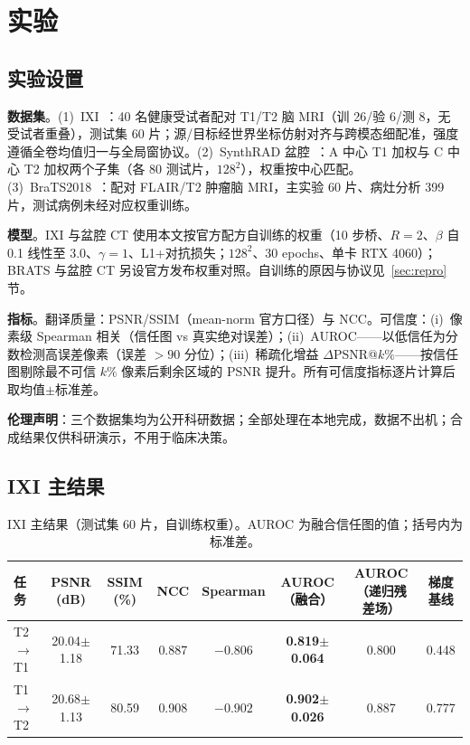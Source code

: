 \documentclass[11pt,a4paper]{ctexart}
\newcommand{\rcrf}{递归残差场}
\begin{document}
\section{实验}

\subsection{实验设置}

\textbf{数据集}。(1)~IXI~\cite{ixi_dataset}：40 名健康受试者配对 T1/T2 脑 MRI（训 26/验 6/测 8，无受试者重叠），测试集 60 片；源/目标经世界坐标仿射对齐与跨模态细配准，强度遵循全卷均值归一与全局窗协议。(2)~SynthRAD 盆腔~\cite{thummerer2023synthrad,nyholm2018goldatlas}：A 中心 T1 加权与 C 中心 T2 加权两个子集（各 80 测试片，$128^2$），权重按中心匹配。(3)~BraTS2018~\cite{menze2015brats}：配对 FLAIR/T2 肿瘤脑 MRI，主实验 60 片、病灶分析 399 片，测试病例未经对应权重训练。

\textbf{模型}。IXI 与盆腔 CT 使用本文按官方配方自训练的权重（10 步桥、$R{=}2$、$\beta$ 自 0.1 线性至 3.0、$\gamma{=}1$、L1+对抗损失；$128^2$、30 epochs、单卡 RTX 4060）；BRATS 与盆腔 CT 另设官方发布权重对照。自训练的原因与协议见~\ref{sec:repro} 节。

\textbf{指标}。翻译质量：PSNR/SSIM（mean-norm 官方口径）与 NCC。可信度：(i)~像素级 Spearman 相关（信任图 vs 真实绝对误差）；(ii)~AUROC——以低信任为分数检测高误差像素（误差 $>90$ 分位）；(iii)~稀疏化增益 $\Delta$PSNR@$k\%$——按信任图剔除最不可信 $k\%$ 像素后剩余区域的 PSNR 提升。所有可信度指标逐片计算后取均值$\pm$标准差。

\textbf{伦理声明}：三个数据集均为公开科研数据；全部处理在本地完成，数据不出机；合成结果仅供科研演示，不用于临床决策。

\subsection{IXI 主结果}

\begin{table}[htbp]
\centering\footnotesize\setlength{\tabcolsep}{4.5pt}
\caption{IXI 主结果（测试集 60 片，自训练权重）。AUROC 为融合信任图的值；括号内为标准差。}
\label{tab:main}
\begin{tabular}{lccccccc}
\toprule
任务 & PSNR (dB) & SSIM (\%) & NCC & Spearman & AUROC（融合） & AUROC（\rcrf） & 梯度基线 \\
\midrule
T2$\to$T1 & 20.04$\pm$1.18 & 71.33 & 0.887 & $-0.806$ & \textbf{0.819$\pm$0.064} & 0.800 & 0.448 \\
T1$\to$T2 & 20.68$\pm$1.13 & 80.59 & 0.908 & $-0.902$ & \textbf{0.902$\pm$0.026} & 0.887 & 0.777 \\
\bottomrule
\end{tabular}
\end{table}
\end{document}
